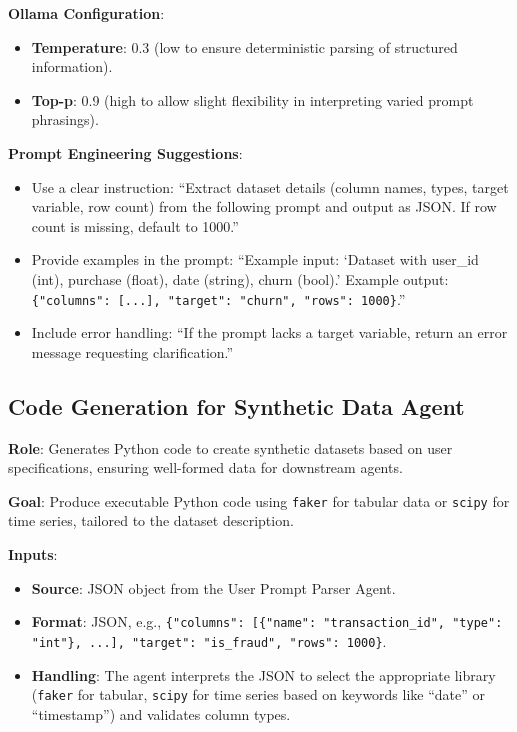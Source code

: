 \documentclass{article}
\begin{document}
\textbf{Ollama Configuration}:
\begin{itemize}[label=--]
    \item \textbf{Temperature}: 0.3 (low to ensure deterministic parsing of structured information).
    \item \textbf{Top-p}: 0.9 (high to allow slight flexibility in interpreting varied prompt phrasings).
\end{itemize}

\textbf{Prompt Engineering Suggestions}:
\begin{itemize}[label=--]
    \item Use a clear instruction: “Extract dataset details (column names, types, target variable, row count) from the following prompt and output as JSON. If row count is missing, default to 1000.”
    \item Provide examples in the prompt: “Example input: ‘Dataset with user\_id (int), purchase (float), date (string), churn (bool).’ Example output: \texttt{\{"columns": [...], "target": "churn", "rows": 1000\}}.”
    \item Include error handling: “If the prompt lacks a target variable, return an error message requesting clarification.”
\end{itemize}

\subsection{Code Generation for Synthetic Data Agent}

\textbf{Role}: Generates Python code to create synthetic datasets based on user specifications, ensuring well-formed data for downstream agents.

\textbf{Goal}: Produce executable Python code using \texttt{faker} for tabular data or \texttt{scipy} for time series, tailored to the dataset description.

\textbf{Inputs}:
\begin{itemize}[label=--]
    \item \textbf{Source}: JSON object from the User Prompt Parser Agent.
    \item \textbf{Format}: JSON, e.g., \texttt{\{"columns": [\{"name": "transaction\_id", "type": "int"\}, ...], "target": "is\_fraud", "rows": 1000\}}.
    \item \textbf{Handling}: The agent interprets the JSON to select the appropriate library (\texttt{faker} for tabular, \texttt{scipy} for time series based on keywords like “date” or “timestamp”) and validates column types.
\end{itemize}
\end{document}
